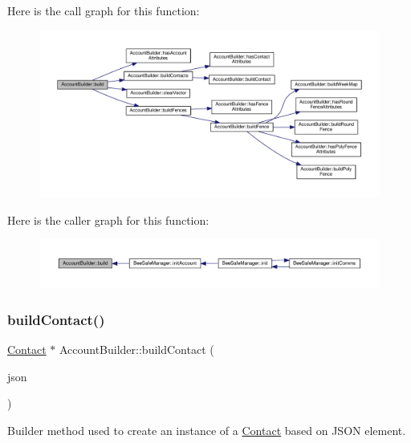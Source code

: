 Here is the call graph for this function\+:
\nopagebreak
\begin{figure}[H]
\begin{center}
\leavevmode
\includegraphics[width=350pt]{d9/daa/class_account_builder_af44cc9897467096f65d3bd768fd01300_cgraph}
\end{center}
\end{figure}
Here is the caller graph for this function\+:
\nopagebreak
\begin{figure}[H]
\begin{center}
\leavevmode
\includegraphics[width=350pt]{d9/daa/class_account_builder_af44cc9897467096f65d3bd768fd01300_icgraph}
\end{center}
\end{figure}
\mbox{\label{class_account_builder_a3a3cc8d8beb8af6c0a9feb79e28adb59}} 
\subsubsection{\texorpdfstring{build\+Contact()}{buildContact()}}
{\footnotesize\ttfamily \hyperlink{class_contact}{Contact} $\ast$ Account\+Builder\+::build\+Contact (\begin{DoxyParamCaption}\item[{const web\+::json\+::value \&}]{json }\end{DoxyParamCaption})\hspace{0.3cm}{\ttfamily [private]}}

Builder method used to create an instance of a \hyperlink{class_contact}{Contact} based on J\+S\+ON element.



